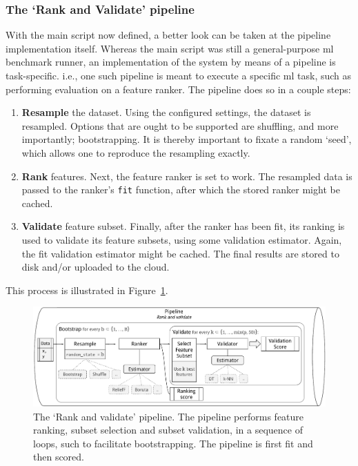 \documentclass[../main.tex]{subfiles}
\begin{document}
\subsubsection{The `Rank and Validate' pipeline}\label{section:pipeline-rank-and-validate}
With the main script now defined, a better look can be taken at the pipeline implementation itself. Whereas the main script was still a general-purpose \gls{ml} benchmark runner, an implementation of the system by means of a pipeline is task-specific. i.e., one such pipeline is meant to execute a specific \gls{ml} task, such as performing evaluation on a feature ranker. The pipeline does so in a couple steps:

\begin{enumerate}
    \item \textbf{Resample} the dataset. Using the configured settings, the dataset is resampled. Options that are ought to be supported are shuffling, and more importantly; bootstrapping. It is thereby important to fixate a random `seed', which allows one to reproduce the resampling exactly.
    \item \textbf{Rank} features. Next, the feature ranker is set to work. The resampled data is passed to the ranker's \texttt{fit} function, after which the stored ranker might be cached.
    \item \textbf{Validate} feature subset. Finally, after the ranker has been fit, its ranking is used to validate its feature subsets, using some validation estimator. Again, the fit validation estimator might be cached. The final results are stored to disk and/or uploaded to the cloud.
\end{enumerate}

This process is illustrated in Figure~\ref{fig:schematic-pipeline-architecture}.

\begin{figure}[ht]
    \centering
    \includegraphics[width=\linewidth]{report/images/schematic-pipeline-architecture.pdf}
    \caption{The `Rank and validate' pipeline. The pipeline performs feature ranking, subset selection and subset validation, in a sequence of loops, such to facilitate bootstrapping. The pipeline is first fit and then scored.}
    \label{fig:schematic-pipeline-architecture}
\end{figure}
\end{document}
